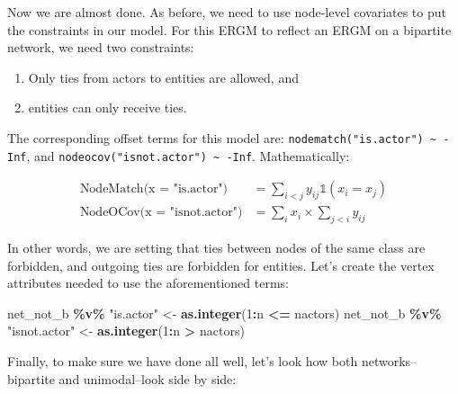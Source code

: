 \documentclass[
]{book}
\newenvironment{Shaded}{\begin{snugshade}}{\end{snugshade}}
\newcommand{\DecValTok}[1]{\textcolor[rgb]{0.00,0.00,0.81}{#1}}
\newcommand{\FunctionTok}[1]{\textcolor[rgb]{0.13,0.29,0.53}{\textbf{#1}}}
\newcommand{\NormalTok}[1]{#1}
\newcommand{\OtherTok}[1]{\textcolor[rgb]{0.56,0.35,0.01}{#1}}
\newcommand{\SpecialCharTok}[1]{\textcolor[rgb]{0.81,0.36,0.00}{\textbf{#1}}}
\newcommand{\StringTok}[1]{\textcolor[rgb]{0.31,0.60,0.02}{#1}}
\providecommand{\tightlist}{%
  \setlength{\itemsep}{0pt}\setlength{\parskip}{0pt}}
\begin{document}
Now we are almost done. As before, we need to use node-level covariates
to put the constraints in our model. For this ERGM to reflect an ERGM on
a bipartite network, we need two constraints:

\begin{enumerate}
\def\labelenumi{\arabic{enumi}.}
\tightlist
\item
  Only ties from actors to entities are allowed, and
\item
  entities can only receive ties.
\end{enumerate}

The corresponding offset terms for this model are: \texttt{nodematch("is.actor")\ \textasciitilde{}\ -Inf},
and \texttt{nodeocov("isnot.actor")\ \textasciitilde{}\ -Inf}. Mathematically:

\begin{align*}
\text{NodeMatch(x = "is.actor")} &= \sum_{i<j} y_{ij}\mathbb{1}\left(x_i = x_j\right) \\
\text{NodeOCov(x = "isnot.actor")} &= \sum_{i} x_i \times \sum_{j<i} y_{ij} 
\end{align*}

In other words, we are setting that ties between nodes of the same class are
forbidden, and outgoing ties are forbidden for entities. Let's create the
vertex attributes needed to use the aforementioned terms:

\begin{Shaded}
\begin{Highlighting}[]
\NormalTok{net\_not\_b }\SpecialCharTok{\%v\%} \StringTok{"is.actor"} \OtherTok{\textless{}{-}} \FunctionTok{as.integer}\NormalTok{(}\DecValTok{1}\SpecialCharTok{:}\NormalTok{n }\SpecialCharTok{\textless{}=}\NormalTok{ nactors)}
\NormalTok{net\_not\_b }\SpecialCharTok{\%v\%} \StringTok{"isnot.actor"} \OtherTok{\textless{}{-}} \FunctionTok{as.integer}\NormalTok{(}\DecValTok{1}\SpecialCharTok{:}\NormalTok{n }\SpecialCharTok{\textgreater{}}\NormalTok{ nactors)}
\end{Highlighting}
\end{Shaded}

Finally, to make sure we have done all well, let's look how both networks--bipartite
and unimodal--look side by side:
\end{document}
